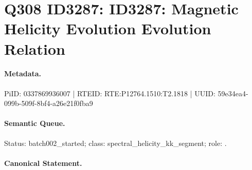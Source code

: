 \section*{Q308 ID3287: ID3287: Magnetic Helicity Evolution Evolution Relation}
\paragraph{Metadata.}
PiID: 0337869936007 | RTEID: RTE:P12764.1510:T2.1818 | UUID: 59e34ea4-099b-509f-8bf4-a26e21f0fba9

\paragraph{Semantic Queue.}
Status: batch002\_started; class: spectral\_helicity\_kk\_segment; role: .

\paragraph{Canonical Statement.}
